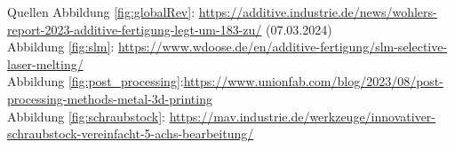 \documentclass[../slides.tex]{subfiles}
\begin{document}
\begin{frame}{Quellen}
    Abbildung \ref{fig:globalRev}: 
    \url{https://additive.industrie.de/news/wohlers-report-2023-additive-fertigung-legt-um-183-zu/} (07.03.2024)\\

    Abbildung \ref{fig:slm}: \url{https://www.wdoose.de/en/additive-fertigung/slm-selective-laser-melting/}\\
    Abbildung \ref{fig:post_processing}:\url{https://www.unionfab.com/blog/2023/08/post-processing-methods-metal-3d-printing} \\
    Abbildung \ref{fig:schraubstock}: \url{https://mav.industrie.de/werkzeuge/innovativer-schraubstock-vereinfacht-5-achs-bearbeitung/} \\
\end{frame}
\end{document}
